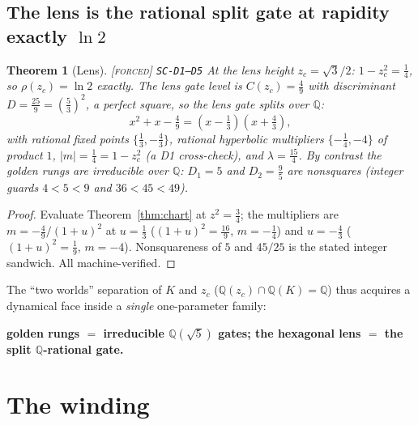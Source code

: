 \documentclass[11pt]{article}
\newcommand{\tagF}{\textcolor{cF}{\textsc{[forced]}}}
\newcommand{\hx}[1]{\textcolor{cC}{\footnotesize\texttt{#1}}}
\newcommand{\Q}{\mathbb{Q}}
\theoremstyle{plain}
\newtheorem{theorem}{Theorem}[section]
\theoremstyle{definition}
\theoremstyle{remark}
\begin{document}
\subsection{The lens is the rational split gate at rapidity exactly $\ln2$}\label{sec:lens}

\begin{theorem}[Lens]\label{thm:lens}\tagF{} \hx{SC-D1--D5}
At the lens height $z_c=\sqrt3/2$: $1-z_c^2=\tfrac14$, so
$\rho(z_c)=\ln2$ \emph{exactly}. The lens gate level is $C(z_c)=\tfrac49$ with
discriminant $D=\tfrac{25}{9}=(\tfrac53)^2$, a perfect square, so the lens gate
\emph{splits over} $\Q$:
\[
x^2+x-\tfrac49=(x-\tfrac13)(x+\tfrac43),
\]
with rational fixed points $\{\tfrac13,-\tfrac43\}$, rational hyperbolic multipliers
$\{-\tfrac14,-4\}$ of product $1$, $|m|=\tfrac14=1-z_c^2$ (a D1 cross-check), and
$\lambda=\tfrac{15}{4}$. By contrast the golden rungs are irreducible over $\Q$:
$D_1=5$ and $D_2=\tfrac95$ are nonsquares (integer guards $4<5<9$ and $36<45<49$).
\end{theorem}

\begin{proof}
Evaluate Theorem~\ref{thm:chart} at $z^2=\tfrac34$; the multipliers are
$m=-\tfrac49/(1+u)^2$ at $u=\tfrac13$ ($(1+u)^2=\tfrac{16}9$, $m=-\tfrac14$) and
$u=-\tfrac43$ ($(1+u)^2=\tfrac19$, $m=-4$). Nonsquareness of $5$ and $45/25$ is the
stated integer sandwich. All machine-verified.
\end{proof}

The ``two worlds'' separation of $K$ and $z_c$ ($\Q(z_c)\cap\Q(K)=\Q$) thus acquires
a dynamical face inside a \emph{single} one-parameter family:
\begin{center}
\textbf{golden rungs $=$ irreducible $\Q(\sqrt5)$ gates;\quad
the hexagonal lens $=$ the split $\Q$-rational gate.}
\end{center}

\section{The winding}\label{sec:winding}
\end{document}
